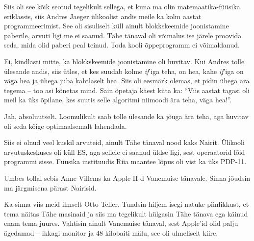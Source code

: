 
Siis oli see kõik seotud tegelikult sellega, et kuna ma olin 
matemaatika-füüsika eriklassis, siis Andres Jaeger ülikoolist andis meile ka kolm aastat programmeerimist. See oli sisuliselt
küll ainult blokkskeemide joonistamine 
paberile, arvuti ligi me ei saanud. Tähe tänaval oli võimalus 
ise järele proovida seda, mida olid paberi peal teinud. 
Toda kooli õppeprogramm ei võimaldanud.


Ei, kindlasti mitte, ka blokkskeemide joonistamine 
oli huvitav. Kui Andres tolle ülesande andis, siis ütles, et kes 
suudab kolme \emph{if}'iga teha, on hea, kahe \emph{if}'iga on 
väga hea ja ühega juba kahtlaselt hea. Siis oli eesmärk olemas, et 
pidin ühega ära tegema -- too asi kõnetas mind. Sain õpetaja käest 
kiita ka: \enquote{Viis aastat tagasi oli 
meil ka üks õpilane, kes suutis selle algoritmi niimoodi ära teha, 
väga hea!}.


Jah, absoluutselt. Loomulikult saab tolle ülesande ka jõuga ära teha, aga huvitav oli seda kõige optimaalsemalt lahendada.


Siis ei olnud veel kuskil arvuteid, ainult Tähe tänaval 
nood kaks Nairit. Ülikooli arvutuskeskuses oli küll ES, aga sellele ei saanud üldse 
ligi, sest operaatorid lõid programmi sisse. Füüsika 
instituudis Riia maantee lõpus oli vist ka 
üks PDP-11.

Umbes tollal sebis Anne Villems 
ka Apple II-d Vanemuise 
tänavale. Sinna jõudsin ma 
järgmisena pärast Nairisid. 

Ka sinna viis meid ilmselt Otto Teller. Tundsin hiljem isegi
natuke piinlikkust, et tema näitas Tähe masinaid ja siis ma tegelikult 
hülgasin Tähe tänava ega käinud enam tema juures. Vahtisin ainult 
Vanemuise tänaval, sest Apple'id olid palju ägedamad -- ikkagi monitor ja 48
kilobaiti mälu, see oli ulmeliselt kiire.

